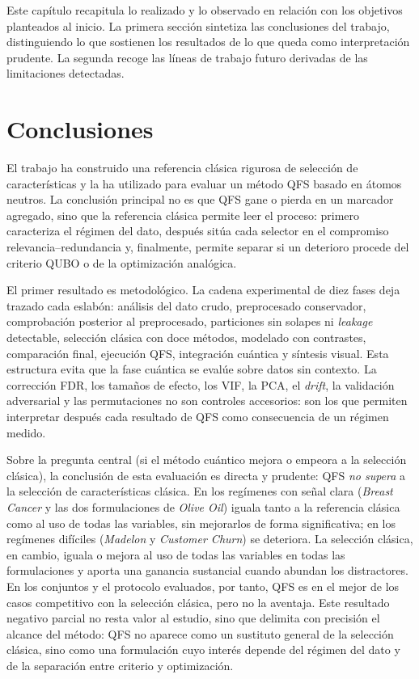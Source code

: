 
Este capítulo recapitula lo realizado y lo observado en relación con
los objetivos planteados al inicio. La primera sección sintetiza las
conclusiones del trabajo, distinguiendo lo que sostienen los resultados
de lo que queda como interpretación prudente. La segunda recoge las
líneas de trabajo futuro derivadas de las limitaciones detectadas.

\section{Conclusiones}

El trabajo ha construido una referencia clásica rigurosa de selección de
características y la ha utilizado para evaluar un método QFS basado en
átomos neutros. La conclusión principal no es que QFS gane o pierda en
un marcador agregado, sino que la referencia clásica permite leer el
proceso: primero caracteriza el régimen del dato, después sitúa cada
selector en el compromiso relevancia--redundancia y, finalmente,
permite separar si un deterioro procede del criterio QUBO o de la
optimización analógica.

El primer resultado es metodológico. La cadena experimental de diez
fases deja trazado cada eslabón: análisis del dato crudo,
preprocesado conservador, comprobación posterior al preprocesado, particiones sin
solapes ni \textit{leakage} detectable, selección clásica con doce
métodos, modelado con contrastes, comparación final, ejecución QFS,
integración cuántica y síntesis visual. Esta estructura evita que la
fase cuántica se evalúe sobre datos sin contexto. La corrección FDR, los
tamaños de efecto, los VIF, la PCA, el \textit{drift}, la validación
adversarial y las permutaciones no son controles accesorios: son los que
permiten interpretar después cada resultado de QFS como consecuencia de
un régimen medido.

Sobre la pregunta central (si el método cuántico mejora o empeora a la
selección clásica), la conclusión de esta evaluación es directa y
prudente: QFS \emph{no supera} a la selección de características clásica.
En los regímenes con señal clara (\textit{Breast Cancer} y las dos
formulaciones de \textit{Olive Oil}) iguala tanto a la referencia clásica
como al uso de todas las variables, sin mejorarlos de forma
significativa; en los regímenes difíciles (\textit{Madelon} y
\textit{Customer Churn}) se deteriora. La selección
clásica, en cambio, iguala o mejora al uso de todas las variables en
todas las formulaciones y aporta una ganancia sustancial cuando abundan
los distractores. En los conjuntos y el protocolo evaluados, por tanto,
QFS es en el mejor de los casos competitivo con la selección clásica,
pero no la aventaja. Este resultado negativo parcial no resta valor al
estudio, sino que delimita con precisión el alcance del método: QFS no
aparece como un sustituto general de la selección clásica, sino como una
formulación cuyo interés depende del régimen del dato y de la separación
entre criterio y optimización.

